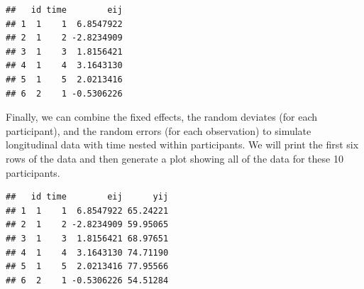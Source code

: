 \documentclass[
]{article}
\newenvironment{Shaded}{\begin{snugshade}}{\end{snugshade}}
\newcommand{\AttributeTok}[1]{\textcolor[rgb]{0.13,0.29,0.53}{#1}}
\newcommand{\DecValTok}[1]{\textcolor[rgb]{0.00,0.00,0.81}{#1}}
\newcommand{\FunctionTok}[1]{\textcolor[rgb]{0.13,0.29,0.53}{\textbf{#1}}}
\newcommand{\NormalTok}[1]{#1}
\newcommand{\OtherTok}[1]{\textcolor[rgb]{0.56,0.35,0.01}{#1}}
\newcommand{\SpecialCharTok}[1]{\textcolor[rgb]{0.81,0.36,0.00}{\textbf{#1}}}
\begin{document}
\begin{verbatim}
##   id time        eij
## 1  1    1  6.8547922
## 2  1    2 -2.8234909
## 3  1    3  1.8156421
## 4  1    4  3.1643130
## 5  1    5  2.0213416
## 6  2    1 -0.5306226
\end{verbatim}

Finally, we can combine the fixed effects, the random deviates (for each
participant), and the random errors (for each observation) to simulate
longitudinal data with time nested within participants. We will print
the first six rows of the data and then generate a plot showing all of
the data for these 10 participants.

\begin{Shaded}
\end{Shaded}

\begin{verbatim}
##   id time        eij      yij
## 1  1    1  6.8547922 65.24221
## 2  1    2 -2.8234909 59.95065
## 3  1    3  1.8156421 68.97651
## 4  1    4  3.1643130 74.71190
## 5  1    5  2.0213416 77.95566
## 6  2    1 -0.5306226 54.51284
\end{verbatim}
\end{document}
